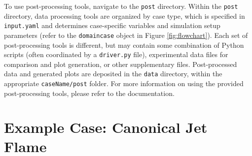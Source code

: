 \documentclass[preprint,12pt, a4paper]{elsarticle}
\begin{document}
To use post-processing tools, navigate to the \texttt{post} directory. Within the \texttt{post} directory, data processing tools are organized by case type, which is specified in \texttt{input.yaml} and determines case-specific variables and simulation setup parameters (refer to the \texttt{domaincase} object in Figure \ref{fig:flowchart}). Each set of post-processing tools is different, but may contain some combination of Python scripts (often coordinated by a \texttt{driver.py} file), experimental data files for comparison and plot generation, or other supplementary files. Post-processed data and generated plots are deposited in the \texttt{data} directory, within the appropriate \texttt{caseName/post} folder. For more information on using the provided post-processing tools, please refer to the documentation. 


\section{Example Case: Canonical Jet Flame}
\label{sec:examples}
\end{document}
